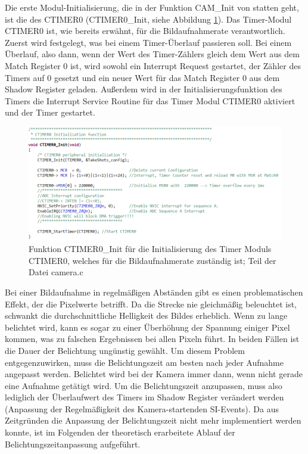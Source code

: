 Die erste Modul-Initialisierung, die in der Funktion \glqq{}CAM\_Init\grqq{} von statten geht, ist die des CTIMER0 (\glqq{}CTIMER0\_Init\grqq{}, siehe Abbildung \ref{fig:CTIMER0Init}). Das Timer-Modul CTIMER0 ist, wie bereits erwähnt, für die Bildaufnahmerate verantwortlich. Zuerst wird festgelegt, was bei einem Timer-Überlauf passieren soll. Bei einem Überlauf, also dann, wenn der Wert des Timer-Zählers gleich dem Wert aus dem Match Register 0 ist, wird sowohl ein Interrupt Request gestartet, der Zähler des Timers auf 0 gesetzt und ein neuer Wert für das Match Register 0 aus dem Shadow Register geladen. Außerdem wird in der Initialisierungsfunktion des Timers die Interrupt Service Routine für das Timer Modul CTIMER0 aktiviert und der Timer gestartet.

\begin{figure}[H] %
\includegraphics[width=\textwidth]{sec7/images/code/CTIMER0Init} 
\centering
\captionsetup{width=.95\textwidth}
\caption[Funktion \glqq{}CTIMER0\_Init\grqq{} aus der Datei \glqq{}camera.c\grqq{}]{Funktion \glqq{}CTIMER0\_Init\grqq{} für die Initialisierung des Timer Moduls CTIMER0, welches für die Bildaufnahmerate zuständig ist; Teil der Datei \glqq{}camera.c\grqq{}}\centering
\label{fig:CTIMER0Init}
\end{figure}

Bei einer Bildaufnahme in regelmäßigen Abständen gibt es einen problematischen Effekt, der die Pixelwerte betrifft. Da die Strecke nie gleichmäßig beleuchtet ist, schwankt die durchschnittliche Helligkeit des Bildes erheblich. Wenn zu lange belichtet wird, kann es sogar zu einer Überhöhung der Spannung einiger Pixel kommen, was zu falschen Ergebnissen bei allen Pixeln führt. In beiden Fällen ist die Dauer der Belichtung ungünstig gewählt. Um diesem Problem entgegenzuwirken, muss die Belichtungszeit am besten nach jeder Aufnahme angepasst werden. Belichtet wird bei der Kamera immer dann, wenn nicht gerade eine Aufnahme getätigt wird. Um die Belichtungszeit anzupassen, muss also lediglich der Überlaufwert des Timers im Shadow Register verändert werden (Anpassung der Regelmäßigkeit des Kamera-startenden SI-Events). Da aus Zeitgründen die Anpassung der Belichtungszeit nicht mehr implementiert werden konnte, ist im Folgenden der theoretisch erarbeitete Ablauf der Belichtungszeitanpassung aufgeführt.\vspace{18pt}

